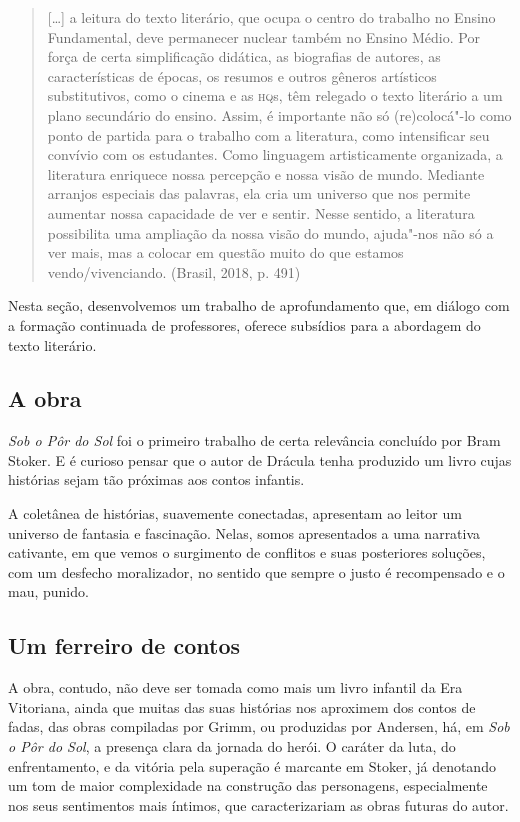\documentclass[12pt]{extarticle}
\begin{document}
\begin{quote}
{[}\ldots{}{]} a leitura do texto literário, que ocupa o centro do trabalho
no Ensino Fundamental, deve permanecer nuclear também no Ensino Médio.
Por força de certa simplificação didática, as biografias de autores, as
características de épocas, os resumos e outros gêneros artísticos
substitutivos, como o cinema e as \textsc{hq}s, têm relegado o texto literário a
um plano secundário do ensino. Assim, é importante não só (re)colocá"-lo
como ponto de partida para o trabalho com a literatura, como
intensificar seu convívio com os estudantes. Como linguagem
artisticamente organizada, a literatura enriquece nossa percepção e
nossa visão de mundo. Mediante arranjos especiais das palavras, ela cria
um universo que nos permite aumentar nossa capacidade de ver e sentir.
Nesse sentido, a literatura possibilita uma ampliação da nossa visão do
mundo, ajuda"-nos não só a ver mais, mas a colocar em questão muito do
que estamos vendo/vivenciando. (Brasil, 2018, p. 491)
\end{quote}

Nesta seção, desenvolvemos um trabalho de aprofundamento que, em diálogo
com a formação continuada de professores, oferece subsídios para a
abordagem do texto literário.

\subsection{A obra}

\emph{Sob o Pôr do Sol} foi o primeiro trabalho de certa relevância
concluído por Bram Stoker. E é curioso pensar que o autor de Drácula
tenha produzido um livro cujas histórias sejam tão próximas aos contos
infantis.

A coletânea de histórias, suavemente conectadas, apresentam ao leitor um
universo de fantasia e fascinação. Nelas, somos apresentados a uma
narrativa cativante, em que vemos o surgimento de conflitos e suas
posteriores soluções, com um desfecho moralizador, no sentido que sempre
o justo é recompensado e o mau, punido.

\subsection{Um ferreiro de contos}

A obra, contudo, não deve ser tomada como mais um livro infantil da Era
Vitoriana, ainda que muitas das suas histórias nos aproximem dos contos
de fadas, das obras compiladas por Grimm, ou produzidas por Andersen,
há, em \emph{Sob o Pôr do Sol}, a presença clara da jornada do herói. O
caráter da luta, do enfrentamento, e da vitória pela superação é
marcante em Stoker, já denotando um tom de maior complexidade na
construção das personagens, especialmente nos seus sentimentos mais
íntimos, que caracterizariam as obras futuras do autor.
\end{document}
